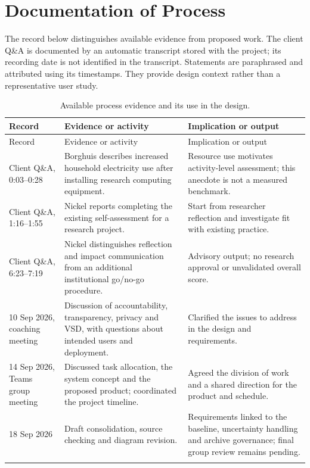 \section{Documentation of Process}
\label{app:process}
The record below distinguishes available evidence from proposed work. The client Q\&A is documented by an automatic transcript stored with the project; its recording date is not identified in the transcript. Statements are paraphrased and attributed using its timestamps. They provide design context rather than a representative user study.

\begin{longtable}{@{}p{}p{}p{}@{}}
\toprule
Record & Evidence or activity & Implication or output \\
\midrule\endfirsthead
\toprule Record & Evidence or activity & Implication or output \\
\midrule\endhead
Client Q\&A, 0:03--0:28 & Borghuis describes increased household electricity use after installing research computing equipment. & Resource use motivates activity-level assessment; this anecdote is not a measured benchmark. \\
\midrule
Client Q\&A, 1:16--1:55 & Nickel reports completing the existing self-assessment for a research project. & Start from researcher reflection and investigate fit with existing practice. \\
\midrule
Client Q\&A, 6:23--7:19 & Nickel distinguishes reflection and impact communication from an additional institutional go/no-go procedure. & Advisory output; no research approval or unvalidated overall score. \\
\midrule
10 Sep 2026, coaching meeting & Discussion of accountability, transparency, privacy and VSD, with questions about intended users and deployment. & Clarified the issues to address in the design and requirements. \\
\midrule
14 Sep 2026, Teams group meeting & Discussed task allocation, the system concept and the proposed product; coordinated the project timeline. & Agreed the division of work and a shared direction for the product and schedule. \\
\midrule
18 Sep 2026 & Draft consolidation, source checking and diagram revision. & Requirements linked to the baseline, uncertainty handling and archive governance; final group review remains pending. \\
\bottomrule
\caption{Available process evidence and its use in the design.}\\
\end{longtable}

